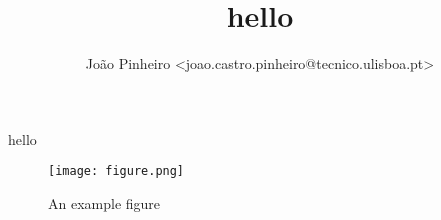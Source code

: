 \documentclass[portuguese, a4paper, titlepage]{article}
\title{hello}
\author{João Pinheiro <joao.castro.pinheiro@tecnico.ulisboa.pt>}
\begin{document}
	\maketitle
	hello

	\begin{figure}[h]
		\centering
		\texttt{[image: figure.png]}
		\caption{An example figure}
		\label{fig:figure-example}
	\end{figure}
\end{document}
